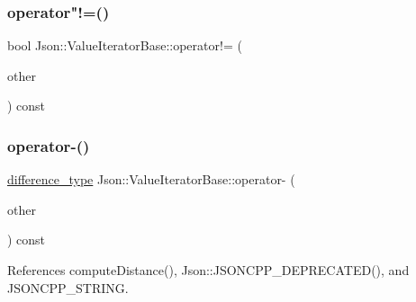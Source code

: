 \subsubsection{\texorpdfstring{operator"!=()}{operator!=()}}
{\footnotesize\ttfamily bool Json\+::\+Value\+Iterator\+Base\+::operator!= (\begin{DoxyParamCaption}\item[{const \hyperlink{classJson_1_1ValueIteratorBase_a9d2a940d03ea06d20d972f41a89149ee_a9d2a940d03ea06d20d972f41a89149ee}{Self\+Type} \&}]{other }\end{DoxyParamCaption}) const\hspace{0.3cm}{\ttfamily [inline]}}

\mbox{\label{classJson_1_1ValueIteratorBase_a98e254263fca5f1fc8fcac7bcb0260bf_a98e254263fca5f1fc8fcac7bcb0260bf}} 
\subsubsection{\texorpdfstring{operator-\/()}{operator-()}}
{\footnotesize\ttfamily \hyperlink{classJson_1_1ValueIteratorBase_a4e44bf8cbd17ec8d6e2c185904a15ebd_a4e44bf8cbd17ec8d6e2c185904a15ebd}{difference\+\_\+type} Json\+::\+Value\+Iterator\+Base\+::operator-\/ (\begin{DoxyParamCaption}\item[{const \hyperlink{classJson_1_1ValueIteratorBase_a9d2a940d03ea06d20d972f41a89149ee_a9d2a940d03ea06d20d972f41a89149ee}{Self\+Type} \&}]{other }\end{DoxyParamCaption}) const\hspace{0.3cm}{\ttfamily [inline]}}



References compute\+Distance(), Json\+::\+J\+S\+O\+N\+C\+P\+P\+\_\+\+D\+E\+P\+R\+E\+C\+A\+T\+E\+D(), and J\+S\+O\+N\+C\+P\+P\+\_\+\+S\+T\+R\+I\+NG.

\mbox{\label{classJson_1_1ValueIteratorBase_a1248d8016f88b51371a0fcbd355b3cfd_a1248d8016f88b51371a0fcbd355b3cfd}} 

